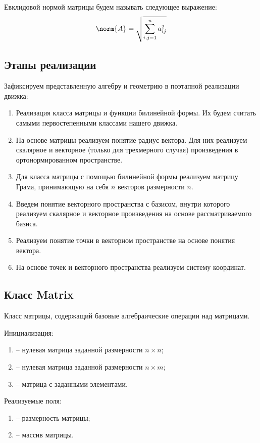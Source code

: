 	Евклидовой нормой матрицы будем называть следующее выражение:
	\[ \norm{A} = \sqrt{\sum_{i, j = 1}^{n} a_{ij}^2} \]

\subsection{Этапы реализации}

	Зафиксируем представленную алгебру и геометрию в поэтапной реализации движка:
	\begin{enumerate}
		\item Реализация класса матрицы и функции билинейной формы. Их будем считать самыми первостепенными классами нашего движка.
		\item На основе матрицы реализуем понятие радиус-вектора. Для них реализуем скалярное и векторное (только для трехмерного случая) произведения в ортонормированном пространстве.
		\item Для класса матрицы с помощью билинейной формы реализуем матрицу Грама, принимающую на себя $n$ векторов размерности $n$.
		\item Введем понятие векторного пространства с базисом, внутри которого реализуем скалярное и векторное произведения на основе рассматриваемого базиса.
		\item Реализуем понятие точки в векторном пространстве на основе понятия вектора.
		\item На основе точек и векторного пространства реализуем систему координат.
	\end{enumerate}

\subsection{Класс Matrix}
	\noindent Класс матрицы, содержащий базовые алгебраические операции над матрицами.

	\noindent Инициализация:
	\begin{enumerate}
		\item {} -- нулевая матрица заданной размерности \( n \times n \);
		\item {} -- нулевая матрица заданной размерности \( n \times m \);
		\item {} -- матрица с заданными элементами.
	\end{enumerate}

	\noindent Реализуемые поля:
	\begin{enumerate}
		\item {} -- размерность матрицы;
		\item {} -- массив матрицы.
	\end{enumerate}


